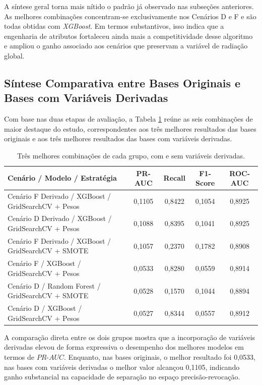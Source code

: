 A síntese geral torna mais nítido o padrão já observado nas subseções anteriores. As melhores combinações concentram-se exclusivamente nos Cenários D e F e são todas obtidas com \textit{XGBoost}. Em termos substantivos, isso indica que a engenharia de atributos fortaleceu ainda mais a competitividade desse algoritmo e ampliou o ganho associado aos cenários que preservam a variável de radiação global.

\subsection{Síntese Comparativa entre Bases Originais e Bases com Variáveis Derivadas}
\label{subsec:sintese_comparativa_originais_calculadas}

Com base nas duas etapas de avaliação, a Tabela \ref{tab:comparativo_top6_geral} reúne as seis combinações de maior destaque do estudo, correspondentes aos três melhores resultados das bases originais e aos três melhores resultados das bases com variáveis derivadas.

\begin{table}[ht]
\centering
\caption{Três melhores combinações de cada grupo, com e sem variáveis derivadas.}
\label{tab:comparativo_top6_geral}
\small
\begin{tabular}{lcccc}
\toprule
\textbf{Cenário / Modelo / Estratégia} & \textbf{PR-AUC} & \textbf{Recall} & \textbf{F1-Score} & \textbf{ROC-AUC} \\
\midrule
Cenário F Derivado / XGBoost / GridSearchCV + Pesos & 0,1105 & 0,8422 & 0,1054 & 0,8925 \\
Cenário D Derivado / XGBoost / GridSearchCV + Pesos & 0,1088 & 0,8395 & 0,1041 & 0,8925 \\
Cenário F Derivado / XGBoost / GridSearchCV + SMOTE & 0,1057 & 0,2370 & 0,1782 & 0,8908 \\
Cenário F / XGBoost / GridSearchCV + Pesos & 0,0533 & 0,8280 & 0,0559 & 0,8914 \\
Cenário D / Random Forest / GridSearchCV + SMOTE & 0,0528 & 0,1570 & 0,1044 & 0,8894 \\
Cenário D / XGBoost / GridSearchCV + Pesos & 0,0527 & 0,8344 & 0,0557 & 0,8912 \\
\bottomrule
\end{tabular}
\end{table}

A comparação direta entre os dois grupos mostra que a incorporação de variáveis derivadas elevou de forma expressiva o desempenho dos melhores modelos em termos de $PR\text{-}AUC$. Enquanto, nas bases originais, o melhor resultado foi 0,0533, nas bases com variáveis derivadas o melhor valor alcançou 0,1105, indicando ganho substancial na capacidade de separação no espaço precisão-revocação.

